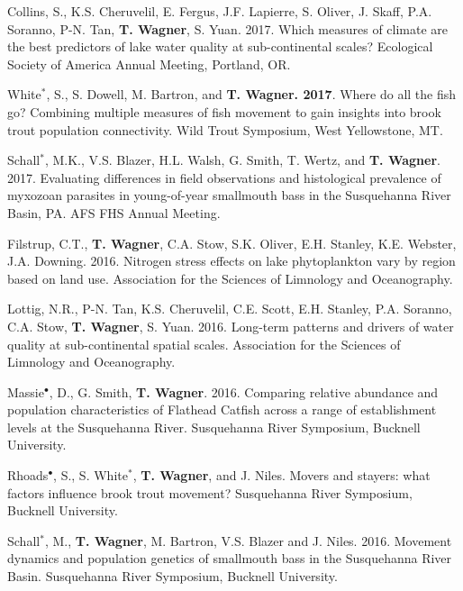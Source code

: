 \documentclass[10pt]{article}
\begin{document}
\begin{flushleft}
\begin{etaremune}
\item Collins, S., K.S. Cheruvelil, E. Fergus, J.F. Lapierre, S. Oliver, J. Skaff, P.A. Soranno, P-N. Tan, {\bf T. Wagner}, S. Yuan. 2017. Which measures of climate are the best predictors of lake water quality at sub-continental scales? Ecological Society of America Annual Meeting, Portland, OR. 

\item White$^*$, S., S. Dowell, M. Bartron, and {\bf T. Wagner. 2017}. Where do all the fish go? Combining multiple measures of fish movement to gain insights into brook trout population connectivity. Wild Trout Symposium, West Yellowstone, MT.

\item Schall$^*$, M.K., V.S. Blazer, H.L. Walsh, G. Smith, T. Wertz, and {\bf T. Wagner}. 2017. Evaluating differences in field observations and histological prevalence of myxozoan parasites in young-of-year smallmouth bass in the Susquehanna River Basin, PA. AFS FHS Annual Meeting.

\item Filstrup, C.T.,  {\bf T. Wagner}, C.A. Stow, S.K. Oliver, E.H. Stanley, K.E. Webster, J.A. Downing. 2016. Nitrogen stress effects on lake phytoplankton vary by region based on land use. Association for the Sciences of Limnology and Oceanography. 

\item Lottig, N.R., P-N. Tan, K.S. Cheruvelil, C.E. Scott, E.H. Stanley, P.A. Soranno, C.A. Stow, {\bf T. Wagner}, S. Yuan. 2016. Long-term patterns and drivers of water quality at sub-continental spatial scales. Association for the Sciences of Limnology and Oceanography. 

\item Massie$^\bullet$, D., G. Smith, {\bf T. Wagner}. 2016. Comparing relative abundance and population characteristics of Flathead Catfish across a range of establishment levels at the Susquehanna River. Susquehanna River Symposium, Bucknell University. 

\item Rhoads$^\bullet$, S., S. White$^*$, {\bf T. Wagner}, and J. Niles. Movers and stayers: what factors influence brook trout movement? Susquehanna River Symposium, Bucknell University.

\item Schall$^*$, M., {\bf T. Wagner}, M. Bartron, V.S. Blazer and J. Niles. 2016. Movement dynamics and population genetics of smallmouth bass in the Susquehanna River Basin. Susquehanna River Symposium, Bucknell University.


\end{etaremune}
\end{flushleft}
\end{document}
